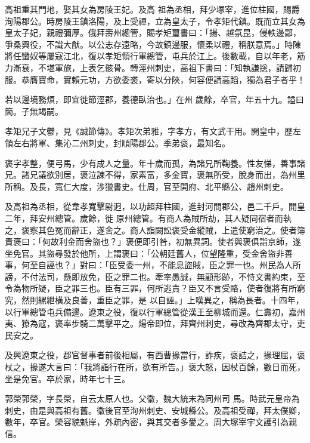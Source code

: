 \begin{pinyinscope}
 高祖重其門地，娶其女為房陵王妃。及高
 祖為丞相，拜少塚宰，進位柱國，賜爵洵陽郡公。時房陵王鎮洛陽，及上受禪，立為皇太子，令孝矩代鎮。既而立其女為皇太子妃，親禮彌厚。俄拜壽州總管，賜孝矩璽書曰：「揚、越氛昆，侵軼邊鄙，爭桑興役，不識大猷。以公志存遠略，今故鎮邊服，懷柔以禮，稱朕意焉。」時陳將任蠻奴等屢寇江北，復以孝矩領行軍總管，屯兵於江上。後數載，自以年老，筋力漸衰，不堪軍旅，上表乞骸骨。轉涇州刺史，高祖下書曰：「知執謙捴，請歸初服。恭膺寶命，實賴元功，方欲委裘，寄以分陜，何容便請高蹈，獨為君子者乎！



 若以邊境務煩，即宜徙節涇郡，養德臥治也。」在州
 歲餘，卒官，年五十九。謚曰簡。子無竭嗣。



 孝矩兄子文鬱，見《誠節傳》。孝矩次弟雅，字孝方，有文武干用。開皇中，歷左領左右將軍、集沁二州刺史，封順陽郡公。季弟褒，最知名。



 褒字孝整，便弓馬，少有成人之量。年十歲而孤，為諸兄所鞠養。性友悌，善事諸兄。諸兄議欲別居，褒泣諫不得，家素富，多金寶，褒無所受，脫身而出，為州里所稱。及長，寬仁大度，涉獵書史。仕周，官至開府、北平縣公、趙州刺史。



 及高祖為丞相，從韋孝寬擊尉迥，以功超拜柱國，進封河間郡公，邑二千戶。開皇二年，拜安州總管。歲餘，徙
 原州總管。有商人為賊所劫，其人疑同宿者而執之，褒察其色冤而辭正，遂舍之。商人詣闕訟褒受金縱賊，上遣使窮治之。使者簿責褒曰：「何故利金而舍盜也？」褒便即引咎，初無異詞。使者與褒俱詣京師，遂坐免官。其盜尋發於他所，上謂褒曰：「公朝廷舊人，位望隆重，受金舍盜非善事，何至自誣也？」對曰：「臣受委一州，不能息盜賊，臣之罪一也。州民為人所謗，不付法司，懸即放免，臣之罪二也。牽率愚誠，無顧形跡，不恃文書約束，至令為物所疑，臣之罪三也。臣有三罪，何所逃責？臣又不言受賂，使者復將有所窮究，然則縲紲橫及良善，重臣之罪，是
 以自誣。」上嘆異之，稱為長者。十四年，以行軍總管屯兵備邊。遼東之役，復以行軍總管從漢王至柳城而還。仁壽初，嘉州夷、獠為寇，褒率步騎二萬擊平之。煬帝即位，拜齊州刺史，尋改為齊郡太守，吏民安之。



 及興遼東之役，郡官督事者前後相屬，有西曹掾當行，詐疾，褒詰之，掾理屈，褒杖之，掾遂大言曰：「我將詣行在所，欲有所告。」褒大怒，因杖百餘，數日而死，坐是免官。卒於家，時年七十三。



 郭榮郭榮，字長榮，自云太原人也。父徽，魏大統末為同州司
 馬。時武元皇帝為刺史，由是與高祖有舊。徽後官至洵州刺史、安城縣公。及高祖受禪，拜太僕卿，數年，卒官。榮容貌魁岸，外疏內密，與其交者多愛之。周大塚宰宇文護引為親信。




\end{pinyinscope}
